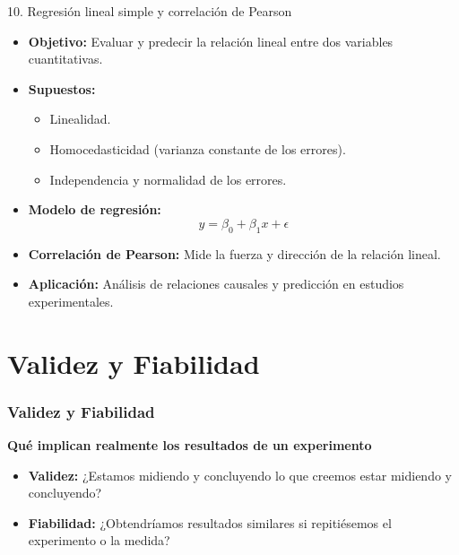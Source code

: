 ﻿\documentclass{beamer}
\begin{document}
\begin{frame}{10. Regresión lineal simple y correlación de Pearson}
\begin{itemize}
    \item \textbf{Objetivo:} Evaluar y predecir la relación lineal entre dos variables cuantitativas.
    \item \textbf{Supuestos:}
    \begin{itemize}
         \item Linealidad.
         \item Homocedasticidad (varianza constante de los errores).
         \item Independencia y normalidad de los errores.
    \end{itemize}
    \item \textbf{Modelo de regresión:}
    \[
    y = \beta_0 + \beta_1 x + \epsilon
    \]
    \item \textbf{Correlación de Pearson:} Mide la fuerza y dirección de la relación lineal.
    \item \textbf{Aplicación:} Análisis de relaciones causales y predicción en estudios experimentales.
\end{itemize}
\end{frame}

\section{Validez y Fiabilidad}
\begin{frame}
    \frametitle{Validez y Fiabilidad}
    \centering
    \textbf{\Large Qué implican realmente los resultados de un experimento}
    \vspace{0.5cm}

    \begin{itemize}
        \item \textbf{Validez:} ¿Estamos midiendo y concluyendo lo que creemos estar midiendo y concluyendo?
        \item \textbf{Fiabilidad:} ¿Obtendríamos resultados similares si repitiésemos el experimento o la medida?
    \end{itemize}
\end{frame}
\end{document}
